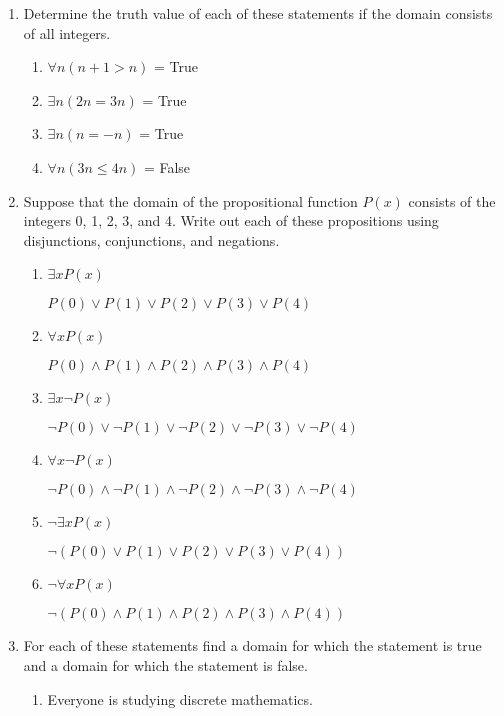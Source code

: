 \documentclass[11pt]{article}
\begin{document}
\begin{enumerate}[label=\textbf{\arabic*.}]
	\item Determine the truth value of each of these statements if the domain consists of all integers.
	\begin{enumerate}[label=\textbf{\alph*)}]
		\item $\forall n(n + 1 > n)$ = True
		\item $\exists n(2n = 3n)$ = True
		\item $\exists n(n = -n)$ = True
		\item $\forall n(3n \le 4n)$ = False
	\end{enumerate}

	\item Suppose that the domain of the propositional function $P(x)$ consists of the integers 0, 1, 2, 3, and 4. Write out each of these propositions using disjunctions, conjunctions, and negations.
	\begin{enumerate}[label=\textbf{\alph*)}]
		\item $\exists xP(x)$
		
		$P(0) \lor P(1) \lor P(2) \lor P(3) \lor P(4)$
		
		\item $\forall xP(x)$
		
		$P(0) \land P(1) \land P(2) \land P(3) \land P(4)$
		
		\item $\exists x\neg P(x)$
		
		$\neg P(0) \lor \neg P(1) \lor \neg P(2) \lor \neg P(3) \lor \neg P(4)$
		
		\item $\forall x\neg P(x)$
		
		$\neg P(0) \land \neg P(1) \land \neg P(2) \land \neg P(3) \land \neg P(4)$
		
		\item $\neg \exists xP(x)$
		
		$\neg(P(0) \lor P(1) \lor P(2) \lor P(3) \lor P(4))$
		
		\item $\neg \forall xP(x)$
		
		$\neg(P(0) \land P(1) \land P(2) \land P(3) \land P(4))$
	\end{enumerate}

	\item For each of these statements find a domain for which the statement is true and a domain for which the statement is false.
	\begin{enumerate}[label=\textbf{\alph*)}]
		\item Everyone is studying discrete mathematics.
		

\end{enumerate}
\end{enumerate}
\end{document}
